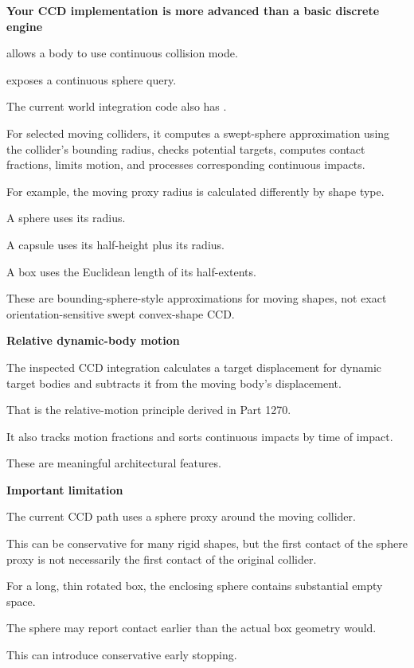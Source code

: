 \textbf{Your CCD implementation is more advanced than a basic discrete engine}

 allows a body to use continuous collision mode.

 exposes a continuous sphere query.

The current world integration code also has .

For selected moving colliders, it computes a swept-sphere approximation using the collider's bounding radius, checks potential targets, computes contact fractions, limits motion, and processes corresponding continuous impacts.

For example, the moving proxy radius is calculated differently by shape type.

A sphere uses its radius.

A capsule uses its half-height plus its radius.

A box uses the Euclidean length of its half-extents.

These are bounding-sphere-style approximations for moving shapes, not exact orientation-sensitive swept convex-shape CCD.

\textbf{Relative dynamic-body motion}

The inspected CCD integration calculates a target displacement for dynamic target bodies and subtracts it from the moving body's displacement.

That is the relative-motion principle derived in Part 1270.

It also tracks motion fractions and sorts continuous impacts by time of impact.

These are meaningful architectural features.

\textbf{Important limitation}

The current CCD path uses a sphere proxy around the moving collider.

This can be conservative for many rigid shapes, but the first contact of the sphere proxy is not necessarily the first contact of the original collider.

For a long, thin rotated box, the enclosing sphere contains substantial empty space.

The sphere may report contact earlier than the actual box geometry would.

This can introduce conservative early stopping.

